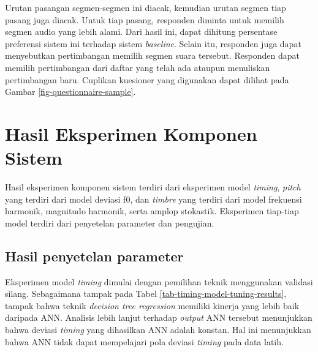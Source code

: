 Urutan pasangan segmen-segmen ini diacak, kemudian urutan segmen tiap pasang juga diacak. Untuk tiap pasang, responden diminta untuk memilih segmen audio yang lebih alami. Dari hasil ini, dapat dihitung persentase preferensi sistem ini terhadap sistem \textit{baseline}. Selain itu, responden juga dapat menyebutkan pertimbangan memilih segmen suara tersebut. Responden dapat memilih pertimbangan dari daftar yang telah ada ataupun menuliskan pertimbangan baru. Cuplikan kuesioner yang digunakan dapat dilihat pada Gambar \ref{fig-questionnaire-sample}. %

\section{Hasil Eksperimen Komponen Sistem}

Hasil eksperimen komponen sistem terdiri dari eksperimen model \textit{timing}, \textit{pitch} yang terdiri dari model deviasi f0, dan \textit{timbre} yang terdiri dari model frekuensi harmonik, magnitudo harmonik, serta amplop stokastik. Eksperimen tiap-tiap model terdiri dari penyetelan parameter dan pengujian.

\subsection{Hasil penyetelan parameter}

Eksperimen model \textit{timing} dimulai dengan pemilihan teknik menggunakan validasi silang. Sebagaimana tampak pada Tabel \ref{tab-timing-model-tuning-results}, tampak bahwa teknik \textit{decision tree regression} memiliki kinerja yang lebih baik daripada ANN. Analisis lebih lanjut terhadap \textit{output} ANN tersebut menunjukkan bahwa deviasi \textit{timing} yang dihasilkan ANN adalah konstan. Hal ini menunjukkan bahwa ANN tidak dapat mempelajari pola deviasi \textit{timing} pada data latih.

